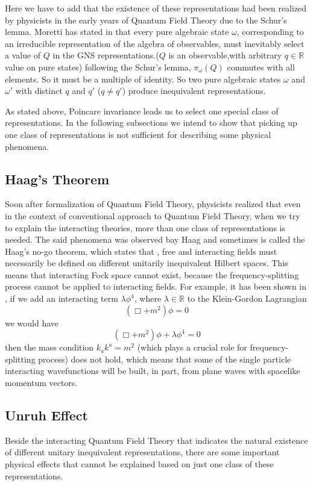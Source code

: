 \documentclass[12pt,a4paper]{article}
\begin{document}
Here we have to add that the existence of these representations had been realized by physicists in the early years of Quantum Field Theory due to the Schur's lemma. Moretti has stated in \cite{moretti} that every pure algebraic state $\omega$, corresponding to an irreducible representation of the algebra of observables, must inevitably select a value of $Q$ in the GNS representations.($Q$ is an observable,with arbitrary $q\in \mathbb{R}$ value on pure states) following the Schur's lemma, $\pi_{\omega}(Q)$ commutes with all elements. So it must be a multiple of identity. So two pure algebraic states $\omega$ and $\omega'$ with distinct $q$ and $q'$ ($q \neq q'$) produce inequivalent representations.

As stated above, Poincare invariance leads us to select one special class of representations. In the following subsections we intend to show that picking up one class of representations is not sufficient for describing some physical phenomena.


\subsection{Haag's Theorem}
Soon after formalization of Quantum Field Theory, physicists realized that even in the context of conventional approach to Quantum Field Theory, when we try to explain the interacting theories, more than one class of representations is needed.
The said phenomena was observed bay Haag and sometimes is called the Haag's no-go theorem, which states that \cite{HaagArt}, free and interacting fields must necessarily be defined on different unitarily inequivalent Hilbert spaces. This means that interacting Fock space cannot exist, because the frequency-splitting process cannot be applied to interacting fields. For example, it has been shown in \cite{Baker}, if we add an interacting term $\lambda \phi^4$, where $\lambda \in \mathbb{R}$ to the Klein-Gordon Lagrangian 
\begin{equation}\label{KG}
      (\Box + m^2)\phi=0
\end{equation} 
we would have 
\begin{equation}
           (\Box + m^2)\phi+\lambda \phi^4=0
\end{equation} then the mass condition $k_ak^a=m^2$
     (which plays a crucial role for frequency-splitting process) does not hold, which means that some of the single particle interacting wavefunctions will be built, in part, from plane waves with spacelike momentum vectors.
\subsection{Unruh Effect}
Beside the interacting Quantum Field Theory that indicates the natural existence of different unitary inequivalent representations, there are some important physical effects that cannot be explained based on just one class of these representations.
\end{document}
